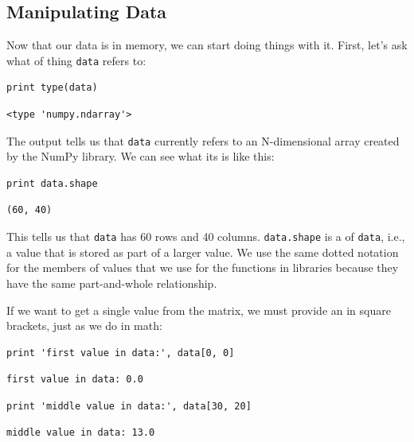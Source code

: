 \documentclass{book}
\begin{document}
\subsection{Manipulating Data}

Now that our data is in memory, we can start doing things with it.
First, let's ask what  of thing
\texttt{data} refers to:

\begin{verbatim}
print type(data)
\end{verbatim}

\begin{verbatim}
<type 'numpy.ndarray'>
\end{verbatim}

The output tells us that \texttt{data} currently refers to an
N-dimensional array created by the NumPy library. We can see what its
 is like this:

\begin{verbatim}
print data.shape
\end{verbatim}

\begin{verbatim}
(60, 40)
\end{verbatim}

This tells us that \texttt{data} has 60 rows and 40 columns.
\texttt{data.shape} is a  of \texttt{data},
i.e., a value that is stored as part of a larger value. We use the same
dotted notation for the members of values that we use for the functions
in libraries because they have the same part-and-whole relationship.

If we want to get a single value from the matrix, we must provide an
 in square brackets, just as we do in math:

\begin{verbatim}
print 'first value in data:', data[0, 0]
\end{verbatim}

\begin{verbatim}
first value in data: 0.0
\end{verbatim}

\begin{verbatim}
print 'middle value in data:', data[30, 20]
\end{verbatim}

\begin{verbatim}
middle value in data: 13.0
\end{verbatim}
\end{document}
